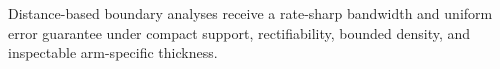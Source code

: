 Distance-based boundary analyses receive a rate-sharp bandwidth and uniform error guarantee under compact support, rectifiability, bounded density, and inspectable arm-specific thickness.